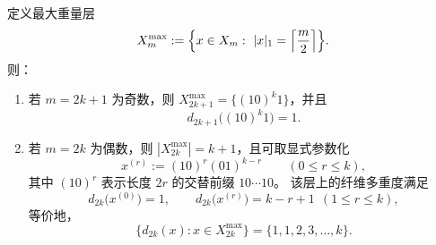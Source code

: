 \begin{conclusion}[最大重量层的稳定词分类与纤维谱闭式：\texorpdfstring{$|x|_1=\lceil m/2\rceil$}{|x|=ceil(m/2)}]\label{con:xi-terminal-max-weight-layer-fiber-spectrum-closed}
定义最大重量层
\[
X_m^{\max}:=\Bigl\{x\in X_m:\ |x|_1=\Bigl\lceil\frac{m}{2}\Bigr\rceil\Bigr\}.
\]
则：
\begin{enumerate}
  \item 若 \(m=2k+1\) 为奇数，则 \(X_{2k+1}^{\max}=\{(10)^k1\}\)，并且
  \[
  d_{2k+1}\bigl((10)^k1\bigr)=1.
  \]
  \item 若 \(m=2k\) 为偶数，则 \(|X_{2k}^{\max}|=k+1\)，且可取显式参数化
  \[
  x^{(r)}:=(10)^r(01)^{k-r}\qquad(0\le r\le k),
  \]
  其中 \((10)^r\) 表示长度 \(2r\) 的交替前缀 \(10\cdots10\)。
  该层上的纤维多重度满足
  \[
  d_{2k}\bigl(x^{(0)}\bigr)=1,\qquad
  d_{2k}\bigl(x^{(r)}\bigr)=k-r+1\ \ (1\le r\le k),
  \]
  等价地，
  \[
  \{d_{2k}(x):x\in X_{2k}^{\max}\}=\{1,1,2,3,\dots,k\}.
  \]
\end{enumerate}
\end{conclusion}

